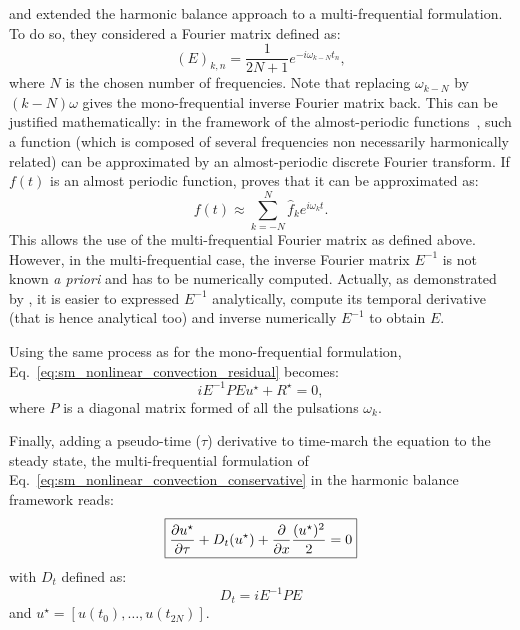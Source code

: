 \citet{Gopinath2007} and \citet{Ekici2007} 
extended the harmonic balance approach to
a multi-frequential formulation. To do so, they considered
a Fourier matrix defined as:
\begin{equation}
	(E)_{k,n} = \frac{1}{2N+1} e^{-i \omega_{k-N} t_n},
\end{equation}
where $N$ is the chosen number of frequencies.
Note that replacing $\omega_{k-N}$ by $(k - N) \omega$ gives
the mono-frequential inverse Fourier matrix back. 
This can be justified mathematically: in the
framework of the almost-periodic functions~\cite{Besicovitch1932},
such a function (which is composed of several
frequencies non necessarily harmonically related) can be approximated
by an almost-periodic
discrete Fourier transform. If $f(t)$ is an almost periodic function,
\citet{Besicovitch1932} proves that it can be approximated as:
\begin{equation}
	f(t) \approx \sum_{k=-N}^{N} \widehat{f}_k 
	e^{i \omega_k t}.
\end{equation}
This allows the use of the multi-frequential Fourier matrix as defined
above. However, in the multi-frequential case, the inverse Fourier matrix
$E^{-1}$ is not known \textit{a priori} 
and has to be numerically computed. Actually, as demonstrated by 
\citet{Gopinath2007}, it is easier to expressed $E^{-1}$ analytically,
compute its temporal derivative (that is hence analytical too) 
and inverse numerically $E^{-1}$ to obtain $E$.

Using the same process as for the mono-frequential formulation,
Eq.~\ref{eq:sm_nonlinear_convection_residual} becomes:
\begin{equation}
	i E^{-1} P E u^\star + R^\star = 0,
\end{equation}
where $P$ is a diagonal matrix formed of all the pulsations $\omega_k$.

Finally, adding a pseudo-time ($\tau$) derivative 
to time-march the equation to the steady state,
the multi-frequential formulation of 
Eq.~\ref{eq:sm_nonlinear_convection_conservative} in the harmonic
balance framework reads:
\begin{equation}
	\fbox{$
	\displaystyle \frac{\partial u^\star}{\partial \tau} +
	D_t (u^\star) + 
	\displaystyle \frac{\partial}{\partial x}
		\frac{(u^\star)^2}{2} = 0
	$}
\end{equation}
with $D_t$ defined as:
\begin{equation}
	D_t = i E^{-1} P E
\end{equation}
and $u^\star = [u(t_0), \ldots, u(t_{2N})]$.

